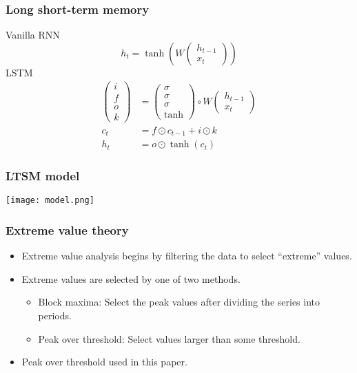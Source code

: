 \documentclass{beamer}
\begin{document}
\begin{frame}
  \frametitle{Long short-term memory}
  Vanilla RNN
  \begin{equation*}
    h_t=\tanh\left( W
      \begin{pmatrix}
        h_{t-1} \\ x_t
      \end{pmatrix}
    \right)
  \end{equation*}
  LSTM
  \begin{align*}
    \begin{pmatrix}
      i \\ f \\ o \\ k
    \end{pmatrix}
    &=
    \begin{pmatrix}
      \sigma \\ \sigma \\ \sigma \\ \tanh
    \end{pmatrix}
    \circ
    W
    \begin{pmatrix}
      h_{t-1} \\ x_t
    \end{pmatrix}
    \\
    c_t &= f \odot c_{t-1} + i \odot k \\
    h_t &= o \odot \tanh\left(c_t\right)
  \end{align*}
\end{frame}

\begin{frame}
  \frametitle{LTSM model}
  \texttt{[image: model.png]}
\end{frame}

\begin{frame}
  \frametitle{Extreme value theory}
  \begin{itemize}
  \item Extreme value analysis begins by filtering the data to select
    ``extreme'' values.
    \item Extreme values are selected by one of two methods.
  \begin{itemize}
  \item Block maxima: Select the peak values after dividing the series into periods.
  \item Peak over threshold: Select values larger than some threshold.
  \end{itemize}
    \item Peak over threshold used in this paper.
  \end{itemize}
\end{frame}
\end{document}
